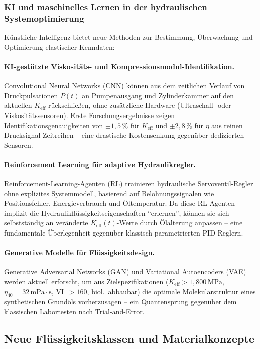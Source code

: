 ﻿\documentclass[a4paper,12pt]{scrreprt}
\theoremstyle{definition}
\begin{document}
\subsubsection{KI und maschinelles Lernen in der hydraulischen Systemoptimierung}

Künstliche Intelligenz bietet neue Methoden zur Bestimmung,
Überwachung und Optimierung elastischer Kenndaten:

\paragraph{KI-gestützte Viskositäts- und Kompressionsmodul-Identifikation.}
Convolutional Neural Networks (CNN) können aus dem zeitlichen
Verlauf von Druckpulsationen $P(t)$ an Pumpenausgang und
Zylinderkammer auf den aktuellen $K_{\mathrm{eff}}$ rückschließen,
ohne zusätzliche Hardware (Ultraschall- oder Viskositätssensoren).
Erste Forschungsergebnisse zeigen Identifikations\-genauigkeiten
von $\pm 1{,}5\,\%$ für $K_{\mathrm{eff}}$ und $\pm 2{,}8\,\%$
für $\eta$ aus reinen Drucksignal-Zeitreihen -- eine drastische
Kostensenkung gegenüber dedizierten Sensoren.

\paragraph{Reinforcement Learning für adaptive Hydraulikregler.}
Reinforcement-Learning-Agenten (RL) trainieren hydraulische
Servoventil-Regler ohne explizites Systemmodell, basierend auf
Belohnungssignalen wie Positionsfehler, Energieverbrauch und
Öltemperatur. Da diese RL-Agenten implizit die Hydraulikflüssigkeits\-eigenschaften
``erlernen'', können sie sich selbstständig an veränderte
$K_{\mathrm{eff}}(t)$-Werte durch Ölalterung anpassen -- eine
fundamentale Überlegenheit gegenüber klassisch parametrierten PID-Reglern.

\paragraph{Generative Modelle für Flüssigkeitsdesign.}
Generative Adversarial Networks (GAN) und Variational Autoencoders (VAE)
werden aktuell erforscht, um aus Zielspezifikationen
($K_{\mathrm{eff}} > 1{,}800\,\mathrm{MPa}$, $\eta_{40} = 32\,\mathrm{mPa\cdot s}$,
VI~$> 160$, biol.\ abbaubar) die optimale Molekularstruktur eines
synthetischen Grundöls vorherzusagen -- ein Quantensprung gegenüber
dem klassischen Labortesten nach Trial-and-Error.

\subsection{Neue Flüssigkeitsklassen und Materialkonzepte}
\end{document}

